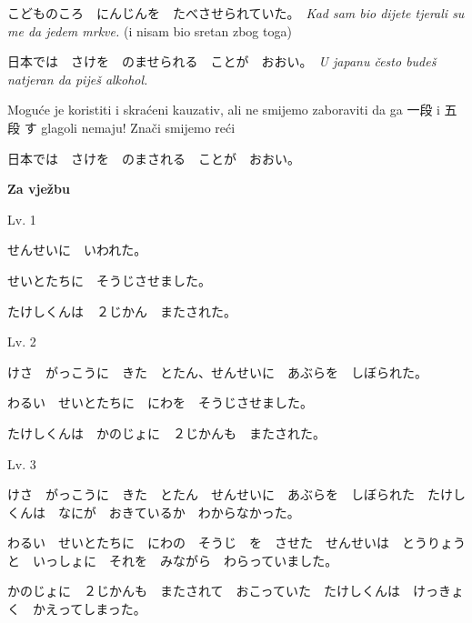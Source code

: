 \documentclass[12pt]{article}
\begin{document}
	こどものころ　にんじんを　たべさせられていた。　\textit{Kad sam bio dijete tjerali su me da jedem mrkve.} (i nisam bio sretan zbog toga)
	
	日本では　さけを　のませられる　ことが　おおい。　\textit{U japanu često budeš natjeran da piješ alkohol.}
	
	Moguće je koristiti i skraćeni kauzativ, ali ne smijemo zaboraviti da ga 一段 i 五段 す glagoli nemaju! Znači smijemo reći
	
	日本では　さけを　のまされる　ことが　おおい。
	
	\vspace{20pt}
	\normalsize \textbf{Za vježbu}
	\vspace{20pt}
	
	\vspace{5pt}
	\normalsize Lv. 1
	\vspace{5pt}
	
	せんせいに　いわれた。
	
	せいとたちに　そうじさせました。
	
	たけしくんは　２じかん　またされた。
	
	\vspace{5pt}
	\normalsize Lv. 2
	\vspace{5pt}
	
	けさ　がっこうに　きた　とたん、せんせいに　あぶらを　しぼられた。
	
	わるい　せいとたちに　にわを　そうじさせました。
	
	たけしくんは　かのじょに　２じかんも　またされた。
	
	\vspace{5pt}
	\normalsize Lv. 3
	\vspace{5pt}
	
	けさ　がっこうに　きた　とたん　せんせいに　あぶらを　しぼられた　たけしくんは　なにが　おきているか　わからなかった。
	
	わるい　せいとたちに　にわの　そうじ　を　させた　せんせいは　とうりょうと　いっしょに　それを　みながら　わらっていました。
	
	かのじょに　２じかんも　またされて　おこっていた　たけしくんは　けっきょく　かえってしまった。
\end{document}
